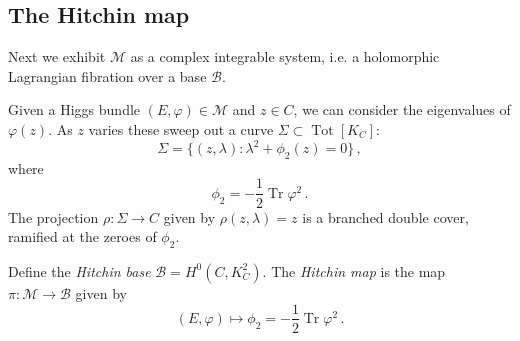 \documentclass[12pt,letterpaper,reqno]{article}
\numberwithin{equation}{section}
\newcommand{\cB}{\ensuremath{\mathcal B}}
\newcommand{\cM}{\ensuremath{\mathcal M}}
\newcommand{\bbC}{\ensuremath{\mathbb C}}
\newcommand{\ti}[1]{\textit{#1}}
\DeclareMathOperator{\Tr}{Tr}
\DeclareMathOperator{\Jac}{Jac}
\DeclareMathOperator{\Tot}{Tot}
\newcommand{\SU}{\mathrm{SU}}
\newcommand{\U}{\mathrm{U}}
\begin{document}




\subsection{The Hitchin map}

Next we exhibit $\cM$ as a complex integrable system,
i.e. a holomorphic Lagrangian fibration over a base 
$\cB$.

Given a Higgs bundle $(E,\varphi) \in \cM$ and $z \in C$,
we can consider the eigenvalues of $\varphi(z)$. As $z$ varies
these sweep out a curve $\Sigma \subset \Tot[K_C]$:
\begin{equation}
  \Sigma = \{ (z,\lambda): \lambda^2 + \phi_2(z) = 0\} \, ,
\end{equation}
where
\begin{equation}
  \phi_2 = - \frac12 \Tr \varphi^2 \, .
\end{equation}
The projection $\rho: \Sigma \to C$ given by $\rho(z,\lambda) = z$ is a branched double cover,
ramified at the zeroes of $\phi_2$.

\begin{defn}
Define the \ti{Hitchin base} $\cB = H^0(C, K_C^2)$.
The \ti{Hitchin map} is the map $\pi: \cM \to \cB$ given by
\begin{equation}
  (E, \varphi) \mapsto \phi_2 = - \frac12 \Tr \varphi^2 \, .
\end{equation}
\end{defn}
\end{document}

